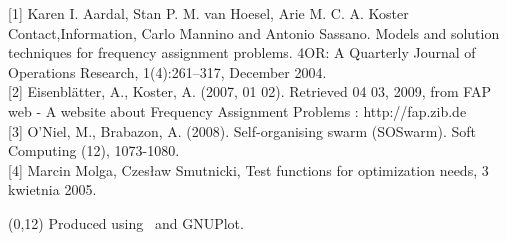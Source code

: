 \documentclass[portrait, a0]{a0poster}
\def\SHeading#1{\medskip\par\noindent{\Large\color{BurntOrange} \it #1}\medskip}
\begin{document}
\begin{textblock}{8}
\SHeading{References}

{[1]} Karen I. Aardal, Stan P. M. van Hoesel, Arie M. C. A. Koster Contact,Information, Carlo Mannino and Antonio Sassano. Models and solution techniques for frequency assignment problems. 4OR: A Quarterly Journal of Operations Research, 1(4):261–317, December 2004.\\
{[2]} Eisenblätter, A., Koster, A. (2007, 01 02). Retrieved 04 03, 2009, from FAP web - A website about Frequency Assignment Problems : http://fap.zib.de\\
{[3]} O'Niel, M., Brabazon, A. (2008). Self-organising swarm (SOSwarm). Soft Computing (12), 1073-1080.\\
{[4]} Marcin Molga, Czesław Smutnicki, Test functions for optimization needs, 3 kwietnia 2005.

\end{textblock}

\begin{textblock}{8}(0,12)
\footnotesize
Produced using \LaTeXe\ and GNUPlot.
\end{textblock}
\end{document}
